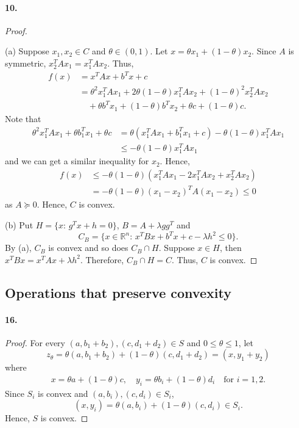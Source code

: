  \paragraph{10.}
  \begin{proof}
    $\,$\par
    (a) Suppose $x_1,x_2\in C$ and $\theta\in(0,1)$. Let $x=\theta x_1+(1-
    \theta)x_2$. Since $A$ is symmetric, $x_2^TAx_1 = x_1^TAx_2$. Thus,
    \begin{align*}
      f(x)
      &= x^TAx+b^Tx+c \\
      &=\theta^2 x_1^TAx_1+2\theta(1-\theta)x_1^TAx_2 + (1-\theta)^2x_2^TAx_2\\
      &\quad+\theta b^Tx_1 + (1-\theta)b^Tx_2 + \theta c + (1-\theta)c.
    \end{align*}
    Note that
    \begin{align*}
      \theta^2x_1^TAx_1+\theta b_1^Tx_1 + \theta c 
      &= \theta(x_1^TAx_1 + b_1^Tx_1+c) - \theta(1-\theta)x_1^TAx_1\\
      &\le -\theta(1-\theta)x_1^TAx_1
    \end{align*}
    and we can get a similar inequality for $x_2$. Hence,
    \begin{align*}
      f(x) &\le -\theta(1-\theta)(x_1^TAx_1 - 2x_1^TAx_2 + x_2^TAx_2) \\
      &= -\theta(1-\theta)(x_1-x_2)^TA(x_1-x_2) \le 0
    \end{align*}
    as $A\succeq 0$. Hence, $C$ is convex.\par
    (b) Put $H=\{x:\, g^Tx+h=0\}$, $B=A+\lambda gg^T$ and 
    \[
      C_B=\{x\in \mathbb{R}^n:\, x^TBx+b^Tx+c-\lambda h^2\le 0\}.
    \]
    By (a), $C_B$ is convex and so does $C_B\cap H$. Suppose $x\in H$, then 
    $x^TBx=x^TAx +\lambda h^2$. Therefore, $C_B\cap H=C$. Thus, $C$ is convex.
  \end{proof}

\subsection{Operations that preserve convexity}
  \paragraph{16.}
  \begin{proof}
    For every $(a,b_1+b_2),(c,d_1+d_2)\in S$ and $0\le\theta\le 1$, let 
    \[
      z_\theta = \theta(a,b_1+b_2)+(1-\theta)(c,d_1+d_2) = (x,y_1+y_2)
    \]
    where
    \begin{align*}
      x = \theta a+(1-\theta) c,\quad
      y_i = \theta b_i+(1-\theta)d_i\quad\text{for $i=1,2$}.
    \end{align*}
    Since $S_i$ is convex and $(a,b_i),(c,d_i)\in S_i$,
    \[
      (x,y_i)=\theta(a,b_i) + (1-\theta)(c,d_i)\in S_i.
    \]
    Hence, $S$ is convex.
  \end{proof}


